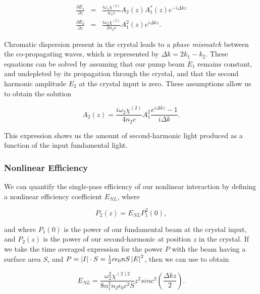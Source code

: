 \begin{eqnarray}
  \label{eq:shg_coupled_wave}
  \frac{\partial E_1}{\partial z} & = & \frac{i \omega_1 \chi^{(2)}}{n_1 c} A_2(z) A^*_1(z) e^{-i\Delta k z}  \\
  \frac{\partial E_2}{\partial z} & = & \frac{i \omega_2 \chi^{(2)}}{2n_2 c}
  A^2_1(z) e^{i\Delta k z}  .
\end{eqnarray}

\noindent
Chromatic dispersion present in the crystal leads to a \emph{phase mismatch} between
the co-propagating waves, which is represented by $\Delta k = 2k_1-k_2$.  These equations can be solved by assuming that our pump beam $E_1$ remains constant, and undepleted by its propagation through the crystal, and that the second harmonic amplitude $E_2$ at the crystal input is zero.  These assumptions allow us to obtain the solution \cite{shen1984principles}

\begin{equation}
  \label{eq:shg_amplitude}
  A_2(z) = \frac{i \omega_2 \chi^{(2)}}{4n_2 c} A_1^2 \frac{e^{i\Delta k z} - 1}{i \Delta k } .
\end{equation}

\noindent
This expression shows us the amount of second-harmonic light produced as a function of the input fundamental light.  

\subsubsection{Nonlinear Efficiency} 
\label{nonlinear_efficiency} 

We can quantify the single-pass efficiency of our nonlinear interaction by defining a nonlinear efficiency coefficient $E_{NL}$, where

\begin{equation}
  \label{eq:nonlinear_eff}
  P_2(z) = E_{NL} P^2_1(0),
\end{equation}

\noindent
and where $P_1(0)$ is the power of our fundamental beam at the crystal input, and $P_2(z)$ is the power of our second-harmonic at position $z$ in the crystal.  If we take the time averaged expression for the power $P$ with the beam having a surface area $S$, and $P = \left| I \right| \cdot S = \frac{1}{2} c \epsilon_0 n S \left| E \right|^2$, then we can use   to obtain

\begin{equation}
  \label{eq:enl}
  E_{NL} = \frac{\omega^2_2 \chi^{(2)2}}{8 n_1^2 n_2 \epsilon_0 c^3 S} z^2 sinc^2 \left(\frac{\Delta k z}{2} \right).
\end{equation}

